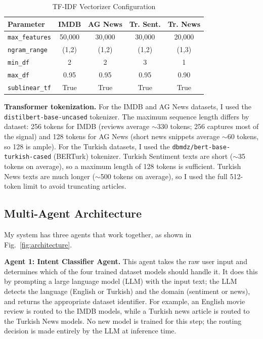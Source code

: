 \documentclass[conference]{IEEEtran}
\begin{document}
\begin{table}[htbp]
	\caption{TF-IDF Vectorizer Configuration}
	\label{tab:tfidf_params}
	\begin{center}
		\footnotesize
		\renewcommand{\arraystretch}{1.2}
		\setlength{\tabcolsep}{6pt}
		\begin{tabular}{lcccc}
			\toprule
			\rowcolor{headerblue}
			\color{white}\textbf{Parameter} & \color{white}\textbf{IMDB} & \color{white}\textbf{AG News} & \color{white}\textbf{Tr. Sent.} & \color{white}\textbf{Tr. News} \\
			\midrule
			\texttt{max\_features} & 50,000 & 30,000 & 30,000 & 20,000 \\
			\texttt{ngram\_range}  & (1,2)  & (1,2)  & (1,2)  & (1,3) \\
			\texttt{min\_df}       & 2      & 2      & 3      & 1 \\
			\texttt{max\_df}       & 0.95   & 0.95   & 0.95   & 0.90 \\
			\texttt{sublinear\_tf} & True   & True   & True   & True \\
			\bottomrule
		\end{tabular}
	\end{center}
\end{table}

\textbf{Transformer tokenization.} For the IMDB and AG News datasets, I used the
\texttt{distilbert-base-uncased} tokenizer. The maximum sequence length differs by dataset:
256 tokens for IMDB (reviews average $\sim$330 tokens; 256 captures most of the signal)
and 128 tokens for AG News (short news snippets average $\sim$60 tokens, so 128 is ample).
For the Turkish datasets, I used the \texttt{dbmdz/bert-base-turkish-cased} (BERTurk)
tokenizer. Turkish Sentiment texts are short ($\sim$35 tokens on average), so a maximum
length of 128 tokens is sufficient. Turkish News texts are much longer ($\sim$500 tokens on
average), so I used the full 512-token limit to avoid truncating articles.

\subsection{Multi-Agent Architecture}
\label{subsec:architecture}

My system has three agents that work together, as shown in Fig.~\ref{fig:architecture}.

\textbf{Agent 1: Intent Classifier Agent.} This agent takes the raw user input and
determines which of the four trained dataset models should handle it. It does this by
prompting a large language model (LLM) with the input text; the LLM detects the language
(English or Turkish) and the domain (sentiment or news), and returns the appropriate dataset
identifier. For example, an English movie review is routed to the IMDB models, while a
Turkish news article is routed to the Turkish News models. No new model is trained for this
step; the routing decision is made entirely by the LLM at inference time.
\end{document}
